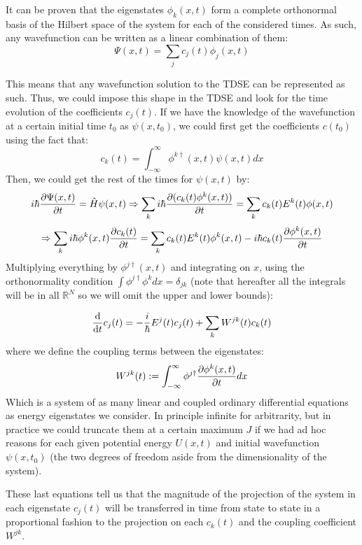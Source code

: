 \documentclass[11pt, a4paper]{article} %
\newcommand{\R}{\mathbb{R}} %
\begin{document}
It can be proven that the eigenstates $\phi_k(x,t)$ form a complete orthonormal basis of the Hilbert space of the system for each of the considered times. As such, any wavefunction can be written as a linear combination of them:
\begin{equation}
\Psi(x,t)=\sum_j c_j(t)\phi_j(x,t)
\end{equation}

This means that any wavefunction solution to the TDSE can be represented as such. Thus, we could impose this shape in the TDSE and look for the time evolution of the coefficients $c_j(t)$. If we have the knowledge of the wavefunction at a certain initial time $t_0$ as $\psi(x,t_0)$, we could first get the coefficients $c(t_0)$ using the fact that:
\begin{equation}
c_k(t)=\int_{-\infty}^\infty\phi^{k \dagger}(x,t) \psi(x,t) dx
\end{equation}
Then, we could get the rest of the times for $\psi(x,t)$ by:
\begin{equation} \label{EigenE}
i\hbar \pdv{\Psi(x,t)}{t}=\hat{H}\psi(x,t)\Rightarrow \sum_k i\hbar \pdv{(c_k(t)\phi^k(x,t))}{t}=\sum_k c_k(t)E^k(t)\phi(x,t) 
\end{equation}
$$
\Rightarrow \sum_k i\hbar \phi^k(x,t)\pdv{c_k(t)}{t}= \sum_k c_k(t)E^k(t)\phi^k(x,t)-i\hbar  c_k(t)\pdv{\phi^k(x,t)}{t}
$$
Multiplying everything by $\phi^{j \dagger}(x,t)$ and integrating on $x$, using the orthonormality condition $\int\phi^{j \dagger} \phi^k dx=\delta_{jk}$ (note that hereafter all the integrals will be in all $\R^N$ so we will omit the upper and lower bounds):

\begin{equation} \label{CoeffsMagic}
\dv{}{t}c_j(t)=-\frac{i}{\hbar}E^j(t) c_j(t) + \sum_k W^{jk}(t)c_k(t)
\end{equation}
where we define the coupling terms between the eigenstates:
\begin{equation}
W^{jk}(t):=\int_{-\infty}^\infty\phi^{j \dagger} \pdv{\phi^k(x,t)}{t} dx
\end{equation}
Which is a system of as many linear and coupled ordinary differential equations as energy eigenstates we consider. In principle infinite for arbitrarity, but in practice we could truncate them at a certain maximum $J$ if we had ad hoc reasons for each given potential energy $U(x,t)$ and initial wavefunction $\psi(x,t_0)$ (the two degrees of freedom aside from the dimensionality of the system).

These last equations tell us that the magnitude of the projection of the system in each eigenstate $c_j(t)$ will be transferred in time from state to state in a proportional fashion to the projection on each $c_k(t)$ and the coupling coefficient $W^{jk}$.
\end{document}
